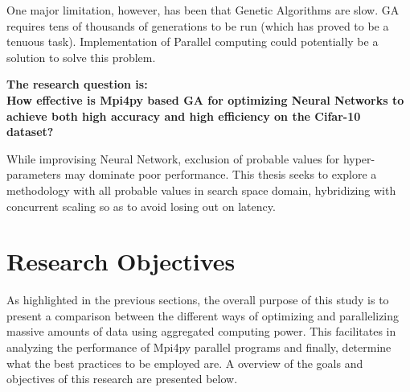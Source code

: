 One major limitation, however, has been that Genetic Algorithms are slow. GA requires tens of thousands of generations to be run (which has proved to be a tenuous task). Implementation of Parallel computing could potentially be a solution to solve this problem. 

\textbf{The research question is:\\
How effective is Mpi4py\cite{dalcin2011parallel} based GA for optimizing Neural Networks to achieve both high accuracy and high efficiency on the Cifar-10 dataset? \\
}



While improvising Neural Network, exclusion of probable values for hyper-parameters may dominate poor performance. This thesis seeks to explore a methodology with all probable values in search space domain, hybridizing with concurrent scaling so as to avoid losing out on latency. 


\section{Research Objectives}
As highlighted in the previous sections, the overall purpose of this study is to present a comparison between the different ways of optimizing and parallelizing massive amounts of data using aggregated computing power. This facilitates in analyzing the performance of Mpi4py parallel programs and finally, determine what the best practices to be employed are. A overview of the goals and objectives of this research are presented below.

